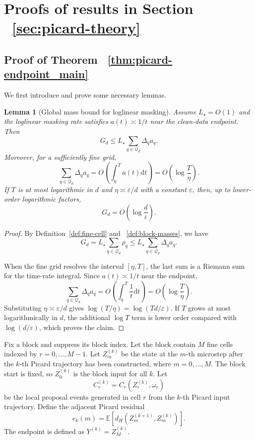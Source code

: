 \documentclass{article}
\newtheorem{lemma}{Lemma}[section]
\newcommand{\dd}{\mathrm{d}}
\begin{document}
\section{Proofs of results in Section ~\ref{sec:picard-theory}}

\subsection{Proof of Theorem ~\ref{thm:picard-endpoint_main}}
\label{appd:picard_converge}
We first introduce and prove some necessary lemmas.
\begin{lemma}[Global mass bound for loglinear masking]
\label{lem:Gd-bound}
Assume $L_\star=O(1)$ and the loglinear masking rate satisfies $a(t)\asymp 1/t$ near the clean-data endpoint. Then
\[
G_d\le L_\star\sum_{q\in\mathcal Q_d}\Delta_q a_q.
\]
Moreover, for a sufficiently fine grid,
\[
\sum_{q\in\mathcal Q_d}\Delta_q a_q=O\left(\int_\eta^T a(t)\dd t\right)=O\left(\log\frac{T}{\eta}\right).
\]
If $T$ is at most logarithmic in $d$ and $\eta\asymp\varepsilon/d$ with a constant $\varepsilon$, then, up to lower-order logarithmic factors,
\[
G_d=O\left(\log\frac d\varepsilon\right).
\]
\end{lemma}

\begin{proof}
By Definition~\ref{def:fine-cell} and ~\ref{def:block-masses}, we have
\[
G_d=L_\star\sum_{q\in\mathcal Q_d}\rho_q \le L_\star\sum_{q\in\mathcal Q_d}\Delta_q a_q.
\]

When the fine grid resolves the interval $[\eta,T]$, the last sum is a Riemann sum for the time-rate integral. Since $a(t)\asymp1/t$ near the endpoint,
\[
\sum_{q\in\mathcal Q_d}\Delta_q a_q
=O\left(\int_\eta^T \frac{1}{t}\dd t\right)
=O\left(\log\frac{T}{\eta}\right).
\]
Substituting $\eta\asymp\varepsilon/d$ gives $\log(T/\eta)=\log(Td/\varepsilon)$. If $T$ grows at most logarithmically in $d$, the additional $\log T$ term is lower order compared with $\log(d/\varepsilon)$, which proves the claim.
\end{proof}

Fix a block and suppress its block index. Let the block contain $M$ fine cells indexed by $r=0,\ldots,M-1$. Let $Z_m^{(k)}$ be the state at the $m$-th microstep after the $k$-th Picard trajectory has been constructed, where $m=0,\ldots,M$. The block start is fixed, so $Z_0^{(k)}$ is the block input for all $k$. Let
\[
C_r^{(k)}=C_r(Z_r^{(k)},\omega_r)
\]
be the local proposal events generated in cell $r$ from the $k$-th Picard input trajectory. Define the adjacent Picard residual
\[
e_k(m)=\mathbb E\left[d_H\left(Z_m^{(k+1)},Z_m^{(k)}\right)\right].
\]
The endpoint is defined as $Y^{(k)}=Z_M^{(k)}$.
\end{document}
